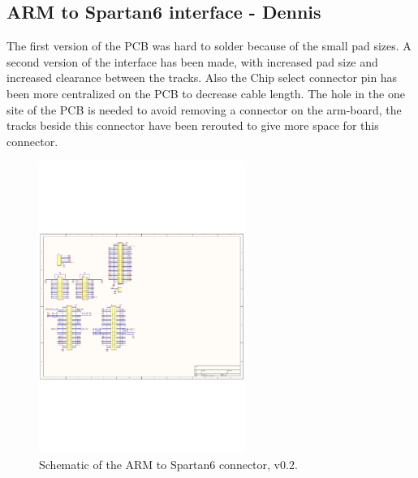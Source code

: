 \subsection{ARM to Spartan6 interface - Dennis}
The first version of the PCB was hard to solder because of the small pad sizes. A second version of the interface has been made, with increased pad size and increased clearance between the tracks. Also the Chip select connector pin has been more centralized on the PCB to decrease cable length. The hole in the one site of the PCB is needed to avoid removing a connector on the arm-board, the tracks beside this connector have been rerouted to give more space for this connector. 
\begin{figure}[H]
	\begin{centering}
		 \includegraphics[width=0.60\textwidth,page=1]{images/dig_to_ea_v0_2}
		\caption{Schematic of the ARM to Spartan6 connector, v0.2.}
	\end{centering}
\end{figure}

